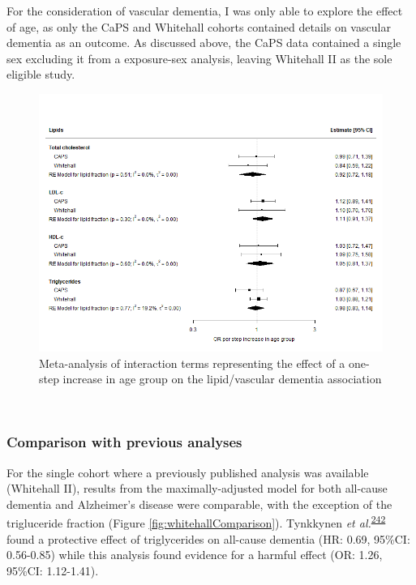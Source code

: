 \documentclass[a4paper, twoside]{templates/ociamthesis}
\begin{document}
For the consideration of vascular dementia, I was only able to explore the effect of age, as only the CaPS and Whitehall cohorts contained details on vascular dementia as an outcome. As discussed above, the CaPS data contained a single sex excluding it from a exposure-sex analysis, leaving Whitehall II as the sole eligible study.





\begin{figure}[H]
\includegraphics[width=1\linewidth]{figures/ipd/interaction_age_vasdem} \caption[shortcap]{Meta-analysis of interaction terms representing the effect of a one-step increase in age group on the lipid/vascular dementia association}\label{fig:interactionVascularAge}
\end{figure}

~

\hypertarget{comparison-with-previous-analyses}{%
\subsubsection{Comparison with previous analyses}\label{comparison-with-previous-analyses}}

For the single cohort where a previously published analysis was available (Whitehall II), results from the maximally-adjusted model for both all-cause dementia and Alzheimer's disease were comparable, with the exception of the trigluceride fraction (Figure \ref{fig:whitehallComparison}). Tynkkynen \emph{et al.}\textsuperscript{\protect\hyperlink{ref-tynkkynen2018}{242}} found a protective effect of triglycerides on all-cause dementia (HR: 0.69, 95\%CI: 0.56-0.85) while this analysis found evidence for a harmful effect (OR: 1.26, 95\%CI: 1.12-1.41).
\end{document}
